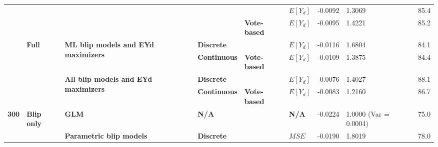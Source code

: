 \documentclass[a4paper,12pt]{article}
\begin{document}
\begin{table}[]
{\begin{tabular}{|l|l|l|l|l|l|l|l|l|}
                                &                                      &                                                              &                                      &                                      & \textbf{$E[Y_d]$} & -0.0092              & 1.3069                        & 85.4              \\ \cline{5-9} 
                                &                                      &                                                              &                                      & \textbf{Vote-based}                  & \textbf{$E[Y_d]$} & -0.0095              & 1.4221                        & 85.2              \\ \cline{2-9} 
                                & \multirow{4}{*}{\textbf{Full}}       & \multirow{2}{*}{\textbf{ML blip models and EYd maximizers}}  & \multicolumn{2}{l|}{\textbf{Discrete}}                                      & \textbf{$E[Y_d]$} & -0.0116              & 1.6804                        & 84.1              \\ \cline{4-9} 
                                &                                      &                                                              & \textbf{Continuous}                  & \textbf{Vote-based}                  & \textbf{$E[Y_d]$} & -0.0109              & 1.3875                        & 84.4              \\ \cline{3-9} 
                                &                                      & \multirow{2}{*}{\textbf{All blip models and EYd maximizers}} & \multicolumn{2}{l|}{\textbf{Discrete}}                                      & \textbf{$E[Y_d]$} & -0.0076              & 1.4027                        & 88.1              \\ \cline{4-9} 
                                &                                      &                                                              & \textbf{Continuous}                  & \textbf{Vote-based}                  & \textbf{$E[Y_d]$} & -0.0083              & 1.2160                        & 86.7              \\ \hline
\multirow{20}{*}{\textbf{300}}  & \multirow{16}{*}{\textbf{Blip only}} & \textbf{GLM}                                                 & \multicolumn{2}{l|}{\textbf{N/A}}                                           & \textbf{N/A}     & -0.0224              & 1.0000 (Var = 0.0004)                       & 75.0              \\ \cline{3-9} 
                                &                                      & \multirow{5}{*}{\textbf{Parametric blip models}}             & \multicolumn{2}{l|}{\multirow{2}{*}{\textbf{Discrete}}}                     & \textbf{$MSE$}  & -0.0190              & 1.8019                        & 78.0              \\ \cline{6-9} 

\end{tabular}}
\end{table}
\end{document}
